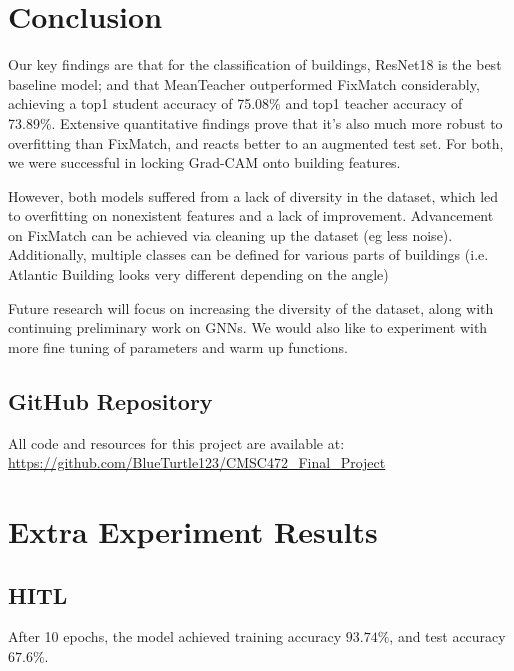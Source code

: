 \documentclass{article}
\begin{document}
\section{Conclusion}

Our key findings are that for the classification of buildings, ResNet18 is the best baseline model; and that MeanTeacher outperformed FixMatch considerably, achieving a top1 student accuracy of 75.08\% and top1 teacher accuracy of 73.89\%. Extensive quantitative findings prove that it's also much more robust to overfitting than FixMatch, and reacts better to an augmented test set. For both, we were successful in locking Grad-CAM onto building features. 

However, both models suffered from a lack of diversity in the dataset, which led to overfitting on nonexistent features and a lack of improvement. Advancement on FixMatch can be achieved via cleaning up the dataset (eg less noise). Additionally, multiple classes can be defined for various parts of buildings (i.e. Atlantic Building looks very different depending on the angle)

Future research will focus on increasing the diversity of the dataset, along with continuing preliminary work on GNNs. We would also like to experiment with more fine tuning of parameters and warm up functions.

\subsection*{GitHub Repository}

All code and resources for this project are available at: \url{https://github.com/BlueTurtle123/CMSC472_Final_Project}

\newpage 
\appendix

\section{Extra Experiment Results}
\label{experiment_results}

\subsection{HITL}

After 10 epochs, the model achieved training accuracy $93.74\%$, and test accuracy $67.6\%$. 
\end{document}
